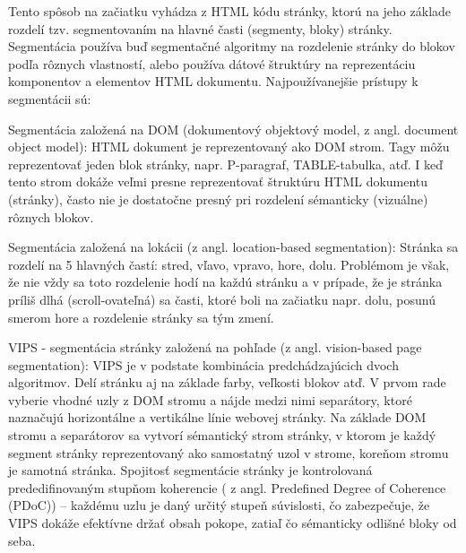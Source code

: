 	Tento spôsob na začiatku vyhádza z HTML kódu stránky, ktorú na jeho základe rozdelí tzv. segmentovaním na hlavné časti (segmenty, bloky) stránky. Segmentácia používa buď segmentačné algoritmy na rozdelenie stránky do blokov podľa rôznych vlastností, alebo používa dátové štruktúry na reprezentáciu komponentov a elementov HTML dokumentu. 
    Najpoužívanejšie prístupy k segmentácii sú:
\begin{my_itemize}
	\item {Segmentácia založená na DOM\cite{DOM} (dokumentový objektový model, z angl. document object model):}
	\newline
\hspace{10mm}HTML dokument je reprezentovaný ako DOM strom. Tagy môžu reprezentovať jeden blok stránky, napr. P-paragraf, TABLE-tabulka, atď. I keď tento strom dokáže veľmi presne reprezentovať štruktúru HTML dokumentu (stránky), často nie je dostatočne presný pri 	rozdelení sémanticky (vizuálne) rôznych blokov. 
	\item {Segmentácia založená na lokácii\cite{block_importance} (z angl. location-based segmentation):}
	\newline
\hspace{10mm}Stránka sa rozdelí na 5 hlavných častí: stred, vľavo, vpravo, hore, dolu. Problémom je však, že nie vždy sa toto rozdelenie hodí na každú stránku a v prípade, že je stránka príliš dlhá (scroll-ovateľná) sa časti, ktoré boli na začiatku napr. dolu, posunú smerom hore a rozdelenie stránky sa tým zmení. 
	\item {VIPS\cite{vips} - segmentácia stránky založená na pohľade (z angl. vision-based page segmentation):}
	\newline
\hspace{10mm}VIPS je v podstate kombinácia predchádzajúcich dvoch algoritmov. Delí stránku aj na základe farby, veľkosti blokov atď. V prvom rade vyberie vhodné uzly z DOM stromu a nájde medzi nimi separátory, ktoré naznačujú horizontálne a vertikálne línie webovej stránky. Na základe DOM stromu a separátorov sa vytvorí sémantický strom stránky, v ktorom je každý segment stránky reprezentovaný ako samostatný uzol v strome, koreňom stromu je samotná stránka. Spojitosť segmentácie stránky je kontrolovaná prededifinovaným stupňom koherencie ( z angl. Predefined Degree of Coherence (PDoC\cite{PDOC})) – každému uzlu je daný určitý stupeň súvislosti, čo zabezpečuje, že VIPS dokáže efektívne držať obsah pokope, zatiaľ čo sémanticky odlišné bloky od seba.
\end{my_itemize}

